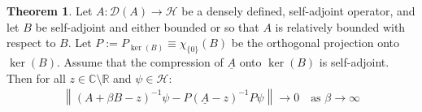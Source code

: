 \documentclass[reqno,12pt,letterpaper]{amsart}
\numberwithin{equation}{section}
\newcommand{\1}{\mathds{1}}
\theoremstyle{definition}
\newtheorem{Thm}[Th]{Theorem}
\begin{document}
	
	\begin{Thm}\label{convergence_to_compression}
		Let \( A: \mathcal{D}(A) \rightarrow \mathcal{H} \) be a densely defined, self-adjoint operator, and let $B$ be self-adjoint and either bounded or so that $A$ is relatively bounded with respect to $B$. Let  \(P := P_{\ker(B)} \equiv \chi_{\{0\}}(B) \)
be the orthogonal projection onto $\ker(B)$.
 Assume that the compression of $\underline{A}$ onto $\ker(B)$ is self-adjoint.
	Then for all \( z \in \mathbb{C} \setminus \mathbb{R} \) and   \( \psi \in \mathcal{H} \):
\begin{align}
	\left\| (A + \beta B - z)^{-1} \psi - P (\underline{A} - z)^{-1} P \psi \right\| \longrightarrow 0 \quad \text{as } \beta \to \infty
\end{align}
	
	\end{Thm}
\end{document}
